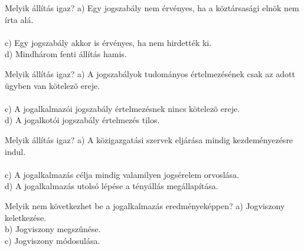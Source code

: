 \begin{frame}

\begin{tcolorbox}[title={29. Kérdés}]
Melyik állítás igaz?
\tcblower
a) Egy jogszabály nem érvényes, ha a köztársasági elnök nem írta alá.\\
\\
c) Egy jogszabály akkor is érvényes, ha nem hirdették ki.\\
d) Mindhárom fenti állítás hamis.
\end{tcolorbox}

\begin{tcolorbox}[title={30. Kérdés}]
Melyik állítás igaz?
\tcblower
a) A jogszabályok tudományos értelmezésének csak az adott ügyben van kötelezõ ereje.\\
\\
c) A jogalkalmazói jogszabály értelmezésnek nincs kötelezõ ereje.\\
d) A jogalkotói jogszabály értelmezés tilos. 
\end{tcolorbox}

\begin{tcolorbox}[title={31. Kérdés}]
Melyik állítás igaz?
\tcblower
a) A közigazgatási szervek eljárása mindig kezdeményezésre indul.\\
\\
c) A jogalkalmazás célja mindig valamilyen jogsérelem orvoslása.\\
d) A jogalkalmazás utolsó lépése a tényállás megállapítása.
\end{tcolorbox}

\begin{tcolorbox}[title={32. Kérdés}]
Melyik nem következhet be a jogalkalmazás eredményeképpen?
\tcblower
a) Jogviszony keletkezése.\\
b) Jogviszony megszûnése.\\
c) Jogviszony módosulása.\\
\end{tcolorbox}

\end{frame}


